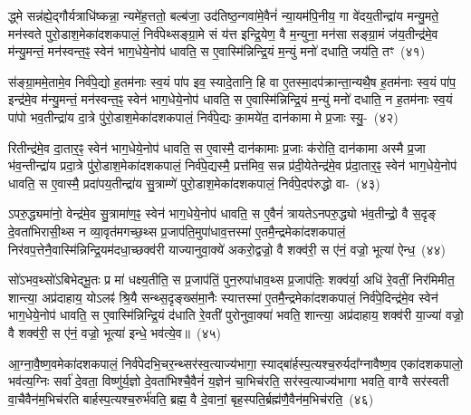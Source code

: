 द्ध्मे सन्न॑ह्ये॒द्गौर्यत्राधि॑ष्कन्ना॒ न्यमे॑ह॒त्ततो॒ बल्ब॑जा॒ उद॑तिष्ठ॒न्गवा॑\-मे॒वैनं॑ न्या॒यम॑पि॒नीय॒ गा वे॑दय॒तीन्द्रा॑य मन्यु॒मते॒ मन॑स्वते पुरो॒डाश॒मेका॑\-दश\-कपालं॒ निर्व॑पेथ्सङ्ग्रा॒मे सं य॑त्त इन्द्रि॒येण॒ वै म॒न्युना॒ मन॑सा सङ्ग्रा॒मं ज॑य॒तीन्द्र॑मे॒व म॑न्यु॒मन्तं॒ मन॑स्वन्त॒ꣴ॒ स्वेन॑ भाग॒धेये॒नोप॑ धावति॒ स ए॒वास्मि॑न्निन्द्रि॒यं म॒न्युं मनो॑ दधाति॒ जय॑ति॒ तꣳ~(४१)\ip

स॑ङ्ग्रा॒ममे॒तामे॒व निर्व॑पे॒द्यो ह॒तम॑नाः स्व॒यं पा॑प इव॒ स्यादे॒तानि॒ हि वा ए॒तस्मा॒दप॑क्रान्ता॒न्यथै॒ष ह॒तम॑नाः स्व॒यं पा॑प॒ इन्द्र॑मे॒व म॑न्यु॒मन्तं॒ मन॑स्वन्त॒ꣴ॒ स्वेन॑ भाग॒धेये॒नोप॑ धावति॒ स ए॒वास्मि॑न्निन्द्रि॒यं म॒न्युं मनो॑ दधाति॒ न ह॒तम॑नाः स्व॒यं पा॑पो भव॒तीन्द्रा॑य दा॒त्रे पु॑रो॒डाश॒मेका॑\-दश\-कपालं॒ निर्व॑पे॒द्यः का॒मये॑त॒ दान॑कामा मे प्र॒जाः स्यु॒-~(४२)\ip

रितीन्द्र॑मे॒व दा॒तार॒ꣴ॒ स्वेन॑ भाग॒धेये॒नोप॑ धावति॒ स ए॒वास्मै॒ दान॑कामाः प्र॒जाः क॑रोति॒ दान॑कामा अस्मै प्र॒जा भ॑व॒न्तीन्द्रा॑य प्रदा॒त्रे पु॑रो॒डाश॒मेका॑\-दश\-कपालं॒ निर्व॑पे॒द्यस्मै॒ प्रत्त॑मिव॒ सन्न प्र॑दी॒येतेन्द्र॑मे॒व प्र॑दा॒तार॒ꣴ॒ स्वेन॑ भाग॒धेये॒नोप॑ धावति॒ स ए॒वास्मै॒ प्रदा॑पय॒तीन्द्रा॑य सु॒त्राम्णे॑ पुरो॒डाश॒मेका॑\-दश\-कपालं॒ निर्व॑पे॒दप॑रुद्धो वा-~(४३)\ip

ऽपरु॒द्ध्यमा॑नो॒ वेन्द्र॑मे॒व सु॒त्रामा॑ण॒ꣴ॒ स्वेन॑ भाग॒धेये॒नोप॑ धावति॒ स ए॒वैनं॑ त्रायते\-ऽनपरु॒द्ध्यो भ॑व॒तीन्द्रो॒ वै स॒दृङ् दे॒वता॑भिरासी॒थ्स न व्या॒वृत॑मगच्छ॒थ्स प्र॒जा\-प॑ति॒मुपा॑\-धाव॒त्तस्मा॑ ए॒तमै॒न्द्रमेका॑\-दश\-कपालं॒ निर॑वप॒त्तेनै॒वास्मि॑न्निन्द्रि॒य\-म॑दधा॒च्छक्व॑री याज्यानुवा॒क्ये॑ अकरो॒द्वज्रो॒ वै शक्व॑री॒ स ए॑नं॒ वज्रो॒ भूत्या॑ ऐन्ध॒~(४४)\ip

सो॑\-ऽभव॒थ्सो॑\-ऽबिभेद्भू॒तः प्र मा॑ धक्ष्य॒तीति॒ स प्र॒जा\-प॑तिं॒ पुन॒रुपा॑धाव॒थ्स प्र॒जा\-प॑तिः॒ शक्व॑र्या॒ अधि॑ रे॒वतीं॒ निर॑मिमीत॒ शान्त्या॒ अप्र॑दाहाय॒ यो\-ऽलꣴ॑ श्रि॒यै सन्थ्स॒दृङ्ख्स॑मा॒नैः स्यात्तस्मा॑ ए॒तमै॒न्द्रमेका॑\-दश\-कपालं॒ निर्व॑पे॒दिन्द्र॑मे॒व स्वेन॑ भाग॒धेये॒नोप॑ धावति॒ स ए॒वास्मि॑न्निन्द्रि॒यं द॑धाति रे॒वती॑ पुरोनुवा॒क्या॑ भवति॒ शान्त्या॒ अप्र॑दाहाय॒ शक्व॑री या॒ज्या॑ वज्रो॒ वै शक्व॑री॒ स ए॑नं॒ वज्रो॒ भूत्या॑ इन्धे॒ भव॑त्ये॒व॥~(४५)\ip

{\anuvakamend[{अपि॒ तꣴ स्यु॑र्वैन्ध भवति॒ चतु॑र्दश च}]}

आ॒ग्ना॒वै॒ष्ण॒वमेका॑दशकपालं॒ निर्व॑पेदभि॒चर॒न्थ्सर॑स्व॒त्याज्य॑\-भागा॒ स्याद्बा॑र्\mbox{}हस्प॒त्य\-श्च॒रुर्यदा᳚ग्नावैष्ण॒व एका॑\-दश\-कपालो॒ भव॑त्य॒ग्निः सर्वा॑ दे॒वता॒ विष्णु॑र्य॒ज्ञो दे॒वता॑भिश्चै॒वैनं॑ य॒ज्ञेन॑ चा॒भिच॑रति॒ सर॑स्व॒त्याज्य॑भागा भवति॒ वाग्वै सर॑स्वती वा॒चैवैन॑म॒भिच॑रति बार्\mbox{}हस्प॒त्यश्च॒रुर्भ॑वति॒ ब्रह्म॒ वै दे॒वानां॒ बृह॒स्पति॒र्ब्रह्म॑णै॒वैन॑म॒भिच॑रति॒~(४६)\ip

